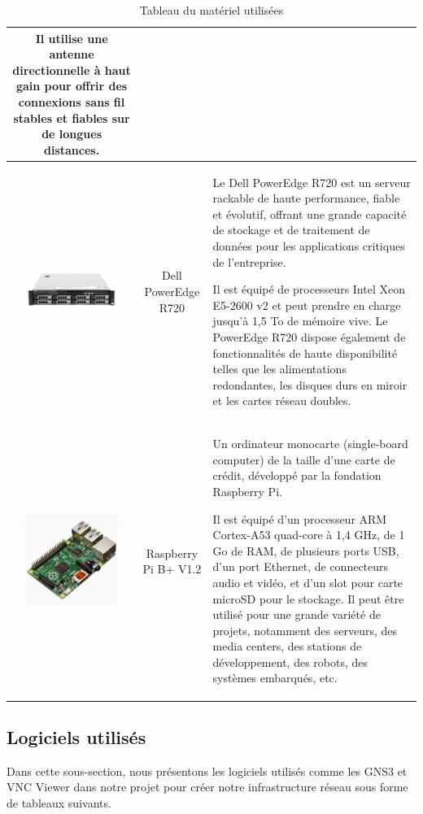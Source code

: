 \begin{table}[H]
\begin{center}
\begin{tabular}{|c{3cm}|c{3cm}|l{10cm}|}
Il utilise une antenne directionnelle à haut gain pour offrir des connexions sans fil stables et fiables sur de longues distances.  \\
\hline
\includegraphics[width=3cm]{Images/dellr720.jpg} & Dell PowerEdge R720 & Le Dell PowerEdge R720 est un serveur rackable de haute performance, fiable et évolutif, offrant une grande capacité de stockage et de traitement de données pour les applications critiques de l'entreprise. 

Il est équipé de processeurs Intel Xeon E5-2600 v2 et peut prendre en charge jusqu'à 1,5 To de mémoire vive. Le PowerEdge R720 dispose également de fonctionnalités de haute disponibilité telles que les alimentations redondantes, les disques durs en miroir et les cartes réseau doubles. \\
\hline
\includegraphics[width=3cm]{Images/RaspberryPi3.jpg} & Raspberry Pi B+ V1.2 & Un ordinateur monocarte (single-board computer) de la taille d'une carte de crédit, développé par la fondation Raspberry Pi. 

Il est équipé d'un processeur ARM Cortex-A53 quad-core à 1,4 GHz, de 1 Go de RAM, de plusieurs ports USB, d'un port Ethernet, de connecteurs audio et vidéo, et d'un slot pour carte microSD pour le stockage. Il peut être utilisé pour une grande variété de projets, notamment des serveurs, des media centers, des stations de développement, des robots, des systèmes embarqués, etc. \\
\hline
\end{tabular}
\caption{Tableau du matériel utilisées}
\label{1}
\end{center}
\end{table}



\subsection{Logiciels utilisés}

Dans cette sous-section, nous présentons les logiciels utilisés comme les GNS3 et VNC Viewer dans notre projet pour créer notre infrastructure réseau sous forme de tableaux suivants. 


